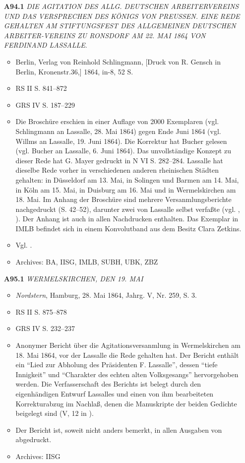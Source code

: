 \begin{itemize}
    \item[\textbf{A94.1}] \textit{DIE AGITATION DES ALLG. DEUTSCHEN ARBEITERVEREINS UND DAS VERSPRECHEN DES KÖNIGS VON PREUSSEN. EINE REDE GEHALTEN AM STIFTUNGSFEST DES ALLGEMEINEN DEUTSCHEN ARBEITER-VEREINS ZU RONSDORF AM 22. MAI 1864 VON FERDINAND LASSALLE}.
    \begin{itemize}
        \item Berlin, Verlag von Reinhold Schlingmann, [Druck von R. Gensch in Berlin, Kronenstr.36,] 1864, in-8, 52 S.
        \item RS II S. 841--872
        \item GRS IV S. 187--229
        \item Die Broschüre erschien in einer Auflage von 2000 Exemplaren (vgl. Schlingmann an Lassalle, 28. Mai 1864) gegen Ende Juni 1864 (vgl. Willms an Lassalle, 19. Juni 1864). Die Korrektur hat Bucher gelesen (vgl. Bucher an Lassalle, 6. Juni 1864). Das unvollständige Konzept zu dieser Rede hat G. Mayer gedruckt in N VI S. 282--284. Lassalle hat dieselbe Rede vorher in verschiedenen anderen rheinischen Städten gehalten: in Düsseldorf am 13. Mai, in Solingen und Barmen am 14. Mai, in Köln am 15. Mai, in Duisburg am 16. Mai und in Wermelskirchen am 18. Mai. Im Anhang der Broschüre sind mehrere Versanmlungsberichte nachgedruckt (S. 42--52), darunter zwei von Lassalle selbst verfaßte (vgl. , ). Der Anhang ist auch in allen Nachdrucken enthalten. Das Exemplar in IMLB befindet sich in einem Konvolutband aus dem Besitz Clara Zetkins.
        \item Vgl. .
        \item Archives: BA, IISG, IMLB, SUBH, UBK, ZBZ
    \end{itemize}
    
    \item[\textbf{A95.1}] \textit{WERMELSKIRCHEN, DEN 19. MAI}
    \begin{itemize}
        \item \textit{Nordstern}, Hamburg, 28. Mai 1864, Jahrg. V, Nr. 259, S. 3.
        \item RS II S. 875--878
        \item GRS IV S. 232--237
        \item Anonymer Bericht über die Agitationsversanmlung in Wermelskirchen am 18. Mai 1864, vor der Lassalle die Rede  gehalten hat. Der Bericht enthält ein ``Lied zur Abholung des Präsidenten F. Lassalle'', dessen ``tiefe Innigkeit'' und ``Charakter des echten alten Volksgesangs'' hervorgehoben werden. Die Verfasserschaft des Berichts ist belegt durch den eigenhändigen Entwurf Lassalles und einen von ihm bearbeiteten Korrekturabzug im Nachlaß, denen die Manuskripte der beiden Gedichte beigelegt sind (V, 12 in ).	
        \item Der Bericht ist, soweit nicht anders bemerkt, in allen Ausgaben von  abgedruckt.
        \item Archives: IISG
    \end{itemize}
    

\end{itemize}
